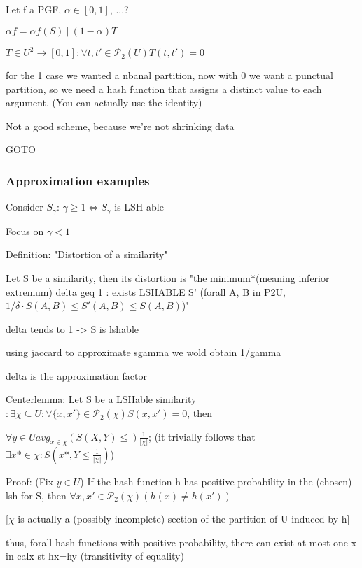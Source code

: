 \documentclass{report}
\begin{document}
	Let f a PGF, $\alpha \in [0, 1]$, ...?
	
	$\alpha f = \alpha f(S)\ |\ (1 - \alpha)T$
	
	$T \in U^2 \to [0, 1] : \forall {t, t'} \in \mathcal{P}_2(U) T(t, t') = 0$
	
	for the 1 case we wanted a nbanal partition, now with 0 we want a punctual partition, so we need a hash function that assigns a distinct value to each argument. (You can actually use the identity)
	
	Not a good scheme, because we're not shrinking data
	
	GOTO %
	
	\subsubsection{Approximation examples}
	
	Consider $S_\gamma$: $\gamma \geq 1 \Leftrightarrow S_\gamma$ is LSH-able
	
	Focus on $\gamma < 1$
	
	Definition: "Distortion of a similarity"
	
	Let S be a similarity, then its distortion is "the minimum*(meaning inferior extremum) delta geq 1 : exists LSHABLE S' (forall {A, B} in P2U, $1/\delta \cdot S(A, B) \leq S'(A, B) \leq S(A, B)$)"
	
	delta tends to 1 -> S is lshable
	
	using jaccard to approximate sgamma we wold obtain 1/gamma
	
	delta is the approximation factor
	
	
	Centerlemma: Let S be a LSHable similarity $ : \exists \chi \subseteq U : \forall \{x, x'\} \in \mathcal{P}_2(\chi) S(x, x')=0$, then
	
	$\forall y \in U avg_{x \in \chi}(S(X, Y) \leq) \frac{1}{|\chi|}$; (it trivially follows that $\exists x* \in \chi : S(x*, Y \leq \frac{1}{|\chi|})$)
	
	Proof: (Fix $y \in U$) If the hash function h has positive probability in the (chosen) lsh for S, then $\forall {x, x'} \in \mathcal{P}_2(\chi) (h(x)\neq h(x'))$
	
	[$\chi$ is actually a (possibly incomplete) section of the partition of U induced by h]
	
	thus, forall hash functions with positive probability, there can exist at most one x in calx st hx=hy (transitivity of equality)
	
\end{document}
